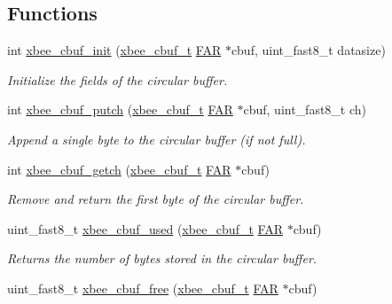 \subsection*{Functions}
\begin{DoxyCompactItemize}
\item 
int \hyperlink{group__util__cbuf_gabf58cafa9f3e989b433a14c23a94cebb}{xbee\+\_\+cbuf\+\_\+init} (\hyperlink{structxbee__cbuf__t}{xbee\+\_\+cbuf\+\_\+t} \hyperlink{group__hal_gaef060b3456fdcc093a7210a762d5f2ed}{F\+AR} $\ast$cbuf, uint\+\_\+fast8\+\_\+t datasize)
\begin{DoxyCompactList}\small\item\em Initialize the fields of the circular buffer. \end{DoxyCompactList}\item 
int \hyperlink{group__util__cbuf_gaab9462b172fea45fc3e5ce2b3a5cca10}{xbee\+\_\+cbuf\+\_\+putch} (\hyperlink{structxbee__cbuf__t}{xbee\+\_\+cbuf\+\_\+t} \hyperlink{group__hal_gaef060b3456fdcc093a7210a762d5f2ed}{F\+AR} $\ast$cbuf, uint\+\_\+fast8\+\_\+t ch)
\begin{DoxyCompactList}\small\item\em Append a single byte to the circular buffer (if not full). \end{DoxyCompactList}\item 
int \hyperlink{group__util__cbuf_gaf78d1608008ebde71b57a6bf34e6a3e1}{xbee\+\_\+cbuf\+\_\+getch} (\hyperlink{structxbee__cbuf__t}{xbee\+\_\+cbuf\+\_\+t} \hyperlink{group__hal_gaef060b3456fdcc093a7210a762d5f2ed}{F\+AR} $\ast$cbuf)
\begin{DoxyCompactList}\small\item\em Remove and return the first byte of the circular buffer. \end{DoxyCompactList}\item 
uint\+\_\+fast8\+\_\+t \hyperlink{group__util__cbuf_gaf3ac1a430fe9dbe3498e96c3b96bb0f7}{xbee\+\_\+cbuf\+\_\+used} (\hyperlink{structxbee__cbuf__t}{xbee\+\_\+cbuf\+\_\+t} \hyperlink{group__hal_gaef060b3456fdcc093a7210a762d5f2ed}{F\+AR} $\ast$cbuf)
\begin{DoxyCompactList}\small\item\em Returns the number of bytes stored in the circular buffer. \end{DoxyCompactList}\item 
uint\+\_\+fast8\+\_\+t \hyperlink{group__util__cbuf_ga9a2eeedf642bdf31dba98aacdc5a7d75}{xbee\+\_\+cbuf\+\_\+free} (\hyperlink{structxbee__cbuf__t}{xbee\+\_\+cbuf\+\_\+t} \hyperlink{group__hal_gaef060b3456fdcc093a7210a762d5f2ed}{F\+AR} $\ast$cbuf)

\end{DoxyCompactItemize}
